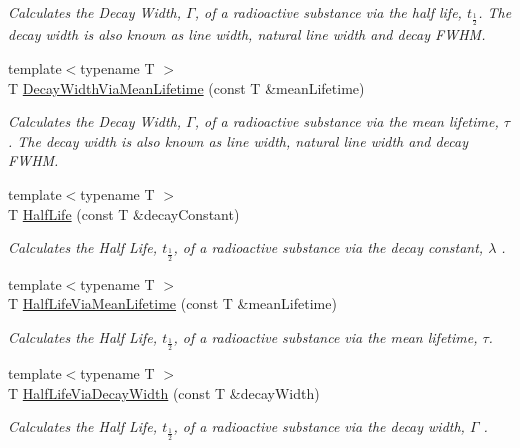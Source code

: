 \begin{DoxyCompactItemize}
\begin{DoxyCompactList}\small\item\em Calculates the Decay Width, $\Gamma$, of a radioactive substance via the half life, $t_{\frac{1}{2}}$. The decay width is also known as line width, natural line width and decay F\+W\+HM. \end{DoxyCompactList}\item 
{\footnotesize template$<$typename T $>$ }\\T \mbox{\hyperlink{group___e_g_x_phys-_decay_width_ga0b65d991f3f3d72cf09a4a7b343a01ca}{Decay\+Width\+Via\+Mean\+Lifetime}} (const T \&mean\+Lifetime)
\begin{DoxyCompactList}\small\item\em Calculates the Decay Width, $\Gamma$, of a radioactive substance via the mean lifetime, $\tau$. The decay width is also known as line width, natural line width and decay F\+W\+HM. \end{DoxyCompactList}\item 
{\footnotesize template$<$typename T $>$ }\\T \mbox{\hyperlink{group___e_g_x_phys-_half_life_ga21d268f154fb91c1c556bbfa7fe83ac1}{Half\+Life}} (const T \&decay\+Constant)
\begin{DoxyCompactList}\small\item\em Calculates the Half Life, $t_{\frac{1}{2}}$, of a radioactive substance via the decay constant, $\lambda$ . \end{DoxyCompactList}\item 
{\footnotesize template$<$typename T $>$ }\\T \mbox{\hyperlink{group___e_g_x_phys-_half_life_gacddef16b62e98b214ec8dd8af7da7dce}{Half\+Life\+Via\+Mean\+Lifetime}} (const T \&mean\+Lifetime)
\begin{DoxyCompactList}\small\item\em Calculates the Half Life, $t_{\frac{1}{2}}$, of a radioactive substance via the mean lifetime, $\tau$. \end{DoxyCompactList}\item 
{\footnotesize template$<$typename T $>$ }\\T \mbox{\hyperlink{group___e_g_x_phys-_half_life_gaba3fda944d1a68ee1016a1f2f5809359}{Half\+Life\+Via\+Decay\+Width}} (const T \&decay\+Width)
\begin{DoxyCompactList}\small\item\em Calculates the Half Life, $t_{\frac{1}{2}}$, of a radioactive substance via the decay width, $\Gamma$ . \end{DoxyCompactList}\item 

\end{DoxyCompactItemize}

